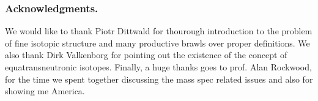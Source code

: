 \subsubsection*{Acknowledgments.}

We would like to thank Piotr Dittwald for thourough introduction to the problem of fine isotopic structure and many productive brawls over proper definitions. We also thank Dirk Valkenborg for pointing out the existence of the concept of equatransneutronic isotopes. Finally, a huge thanks goes to prof. Alan Rockwood, for the time we spent together discussing the mass spec related issues and also for showing me America.